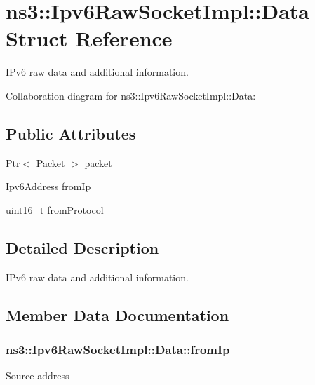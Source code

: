 \hypertarget{structns3_1_1Ipv6RawSocketImpl_1_1Data}{}\section{ns3\+:\+:Ipv6\+Raw\+Socket\+Impl\+:\+:Data Struct Reference}
\label{structns3_1_1Ipv6RawSocketImpl_1_1Data}


I\+Pv6 raw data and additional information.  




Collaboration diagram for ns3\+:\+:Ipv6\+Raw\+Socket\+Impl\+:\+:Data\+:
\subsection*{Public Attributes}
\begin{DoxyCompactItemize}
\item 
\hyperlink{classns3_1_1Ptr}{Ptr}$<$ \hyperlink{classns3_1_1Packet}{Packet} $>$ \hyperlink{structns3_1_1Ipv6RawSocketImpl_1_1Data_a854e11b87ad90adab5b6b7928278803f}{packet}
\item 
\hyperlink{classns3_1_1Ipv6Address}{Ipv6\+Address} \hyperlink{structns3_1_1Ipv6RawSocketImpl_1_1Data_abfd96dad6e7fd2b86363e36fd503b162}{from\+Ip}
\item 
uint16\+\_\+t \hyperlink{structns3_1_1Ipv6RawSocketImpl_1_1Data_a8a576c6fc65cd170c6d67fdf83b15086}{from\+Protocol}
\end{DoxyCompactItemize}


\subsection{Detailed Description}
I\+Pv6 raw data and additional information. 

\subsection{Member Data Documentation}
\subsubsection[{\texorpdfstring{from\+Ip}{fromIp}}]{ ns3\+::\+Ipv6\+Raw\+Socket\+Impl\+::\+Data\+::from\+Ip}\hypertarget{structns3_1_1Ipv6RawSocketImpl_1_1Data_abfd96dad6e7fd2b86363e36fd503b162}{}\label{structns3_1_1Ipv6RawSocketImpl_1_1Data_abfd96dad6e7fd2b86363e36fd503b162}
Source address 
